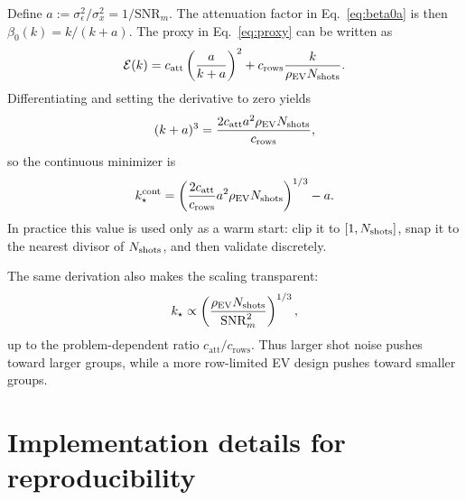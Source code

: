 Define $a:=\sigma_\epsilon^2/\sigma_x^2=1/\mathrm{SNR}_m$. The attenuation factor in Eq.~\eqref{eq:beta0a} is then $\beta_0(k)=k/(k+a)$. The proxy in Eq.~\eqref{eq:proxy} can be written as
\begin{equation}
\mathcal{E}(k)=c_{\mathrm{att}}\left(\frac{a}{k+a}\right)^2 + c_{\mathrm{rows}}\frac{k}{\rho_{\mathrm{EV}}N_{\mathrm{shots}}}.
\end{equation}
Differentiating and setting the derivative to zero yields
\begin{equation}
(k+a)^3 = \frac{2c_{\mathrm{att}}a^2\rho_{\mathrm{EV}}N_{\mathrm{shots}}}{c_{\mathrm{rows}}},
\end{equation}
so the continuous minimizer is
\begin{equation}
k_\star^{\mathrm{cont}} = \left(\frac{2c_{\mathrm{att}}}{c_{\mathrm{rows}}}a^2\rho_{\mathrm{EV}}N_{\mathrm{shots}}\right)^{1/3} - a.
\end{equation}
In practice this value is used only as a warm start: clip it to $[1,N_{\mathrm{shots}}]$, snap it to the nearest divisor of $N_{\mathrm{shots}}$, and then validate discretely.

The same derivation also makes the scaling transparent:
\begin{equation}
k_\star \propto \left(\frac{\rho_{\mathrm{EV}}N_{\mathrm{shots}}}{\mathrm{SNR}_m^2}\right)^{1/3},
\end{equation}
up to the problem-dependent ratio $c_{\mathrm{att}}/c_{\mathrm{rows}}$. Thus larger shot noise pushes toward larger groups, while a more row-limited EV design pushes toward smaller groups.

\section{Implementation details for reproducibility}
\label{sec:apprepro}

